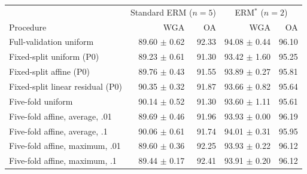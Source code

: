 \begin{tabularx}{\linewidth}{@{}Xrrrr@{}}
\toprule
& \multicolumn{2}{c}{Standard ERM ($n=5$)} & \multicolumn{2}{c}{ERM$^*$ ($n=2$)}\\
Procedure & WGA & OA & WGA & OA\\\midrule
Full-validation uniform & 89.60 $\pm$ 0.62 & 92.33 & 94.08 $\pm$ 0.44 & 96.10\\
Fixed-split uniform (P0) & 89.23 $\pm$ 0.61 & 91.30 & 93.42 $\pm$ 1.60 & 95.25\\
Fixed-split affine (P0) & 89.76 $\pm$ 0.43 & 91.55 & 93.89 $\pm$ 0.27 & 95.81\\
Fixed-split linear residual (P0) & 90.35 $\pm$ 0.32 & 91.87 & 93.66 $\pm$ 0.82 & 95.64\\
Five-fold uniform & 90.14 $\pm$ 0.52 & 91.30 & 93.60 $\pm$ 1.11 & 95.61\\
Five-fold affine, average, .01 & 89.69 $\pm$ 0.46 & 91.96 & 93.93 $\pm$ 0.00 & 96.19\\
Five-fold affine, average, .1 & 90.06 $\pm$ 0.61 & 91.74 & 94.01 $\pm$ 0.31 & 95.95\\
Five-fold affine, maximum, .01 & 89.60 $\pm$ 0.36 & 92.25 & 93.93 $\pm$ 0.22 & 96.12\\
Five-fold affine, maximum, .1 & 89.44 $\pm$ 0.17 & 92.41 & 93.91 $\pm$ 0.20 & 96.12\\
\bottomrule
\end{tabularx}
